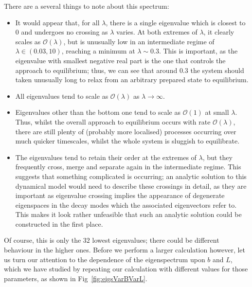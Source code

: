 There are a several things to note about this spectrum:
\begin{itemize}
 \item It would appear that, for all $\lambda$, there is a single eigenvalue which
 is closest to $0$ and undergoes no crossing as $\lambda$ varies. At both extremes of
 $\lambda$, it clearly scales as $\mathcal{O}(\lambda)$, but is unusually low in an intermediate regime of $\lambda \in (0.03, 10)$, reaching a minimum at $\lambda \sim 0.3$. This is
 important, as the eigenvalue with smallest negative real part is the one that controls
 the approach to equilibrium; thus, we can see that around $0.3$ the system should taken unusually long to relax from an arbitrary prepared state to equilibrium.
 \item All eigenvalues tend to scale as $\mathcal{O}(\lambda)$ as $\lambda \rightarrow \infty$.
 \item Eigenvalues other than the bottom one tend to scale as $\mathcal{O}(1)$ at small
 $\lambda$. Thus, whilst the overall approach to equilibrium occurs with rate 
 $\mathcal{O}(\lambda)$, there are still plenty of (probably more localised) processes 
 occurring over much quicker timescales, whilst the whole system is sluggish to 
 equilibrate.
 \item The eigenvalues tend to retain their order at the extremes of $\lambda$, 
 but they frequently cross, merge and separate again in the intermediate regime. This suggests that something complicated is occurring; an analytic solution to this dynamical model would need to describe these crossings in detail, as they are important as
 eigenvalue crossing implies the appearance of degenerate eigenspaces in the decay modes
 which the associated eigenvectors refer to. This makes it look rather 
 unfeasible that such an analytic solution could be constructed in the first place.
\end{itemize}
Of course, this is only the $32$ lowest eigenvalues; there could be different behaviour
in the higher ones. Before we perform a larger calculation however, let us turn our
attention to the dependence of the eigenspectrum upon $b$ and $L$, which we have studied
by repeating our calculation with different values for those parameters, as shown in
Fig~\ref{fig:eigsVarBVarL}.
